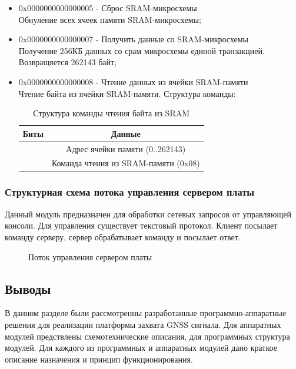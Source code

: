 \begin{itemize}
\item 0x0000000000000005 - Сброс SRAM-микросхемы \\ 
	Обнуление всех ячеек памяти SRAM-микросхемы;

\item 0x0000000000000007 - Получить данные со SRAM-микросхемы \\ 
	Получение 256КБ данных со срам микросхемы единой транзакцией. Возвращяется 262143 байт;

\item 0x0000000000000008 - Чтение данных из ячейки SRAM-памяти \\ 
	Чтение байта из ячейки SRAM-памяти. Структура команды:
	\begin{table}[H]
	\begin{center}
	\caption{Структура команды чтения байта из SRAM}
	\label{tab:read_sram}
	\begin{tabular}{|c|c|}
		\hline
			Биты & Данные \\
		\hline
			[25:08] & Адрес ячейки памяти (0..262143) \\
		\hline
			[07:00] & Команда чтения из SRAM-памяти (0x08) \\
		\hline
	\end{tabular}
	\end{center}
	\end{table}
\end{itemize}


\subsubsection*{Структурная схема потока управления сервером платы}
Данный модуль предназначен для обработки сетевых запросов от управляющей консоли. Для управления существует текстовый протокол.
Клиент посылает команду серверу, сервер обрабатывает команду и посылает ответ.

\begin{figure}[H]
\begin{center}
\end{center}
\caption{Поток управления сервером платы}
\label{pic:gui_server}
\end{figure}


\subsection*{Выводы}
В данном разделе были рассмотренны разработанные программно-аппаратные решения для реализации платформы захвата GNSS сигнала.
Для аппаратных модулей предствлены схемотехнические описания, для программных структура модулей. Для каждого из программных
и аппаратных модулей дано краткое описание назначения и принцип функционирования.


\newpage

